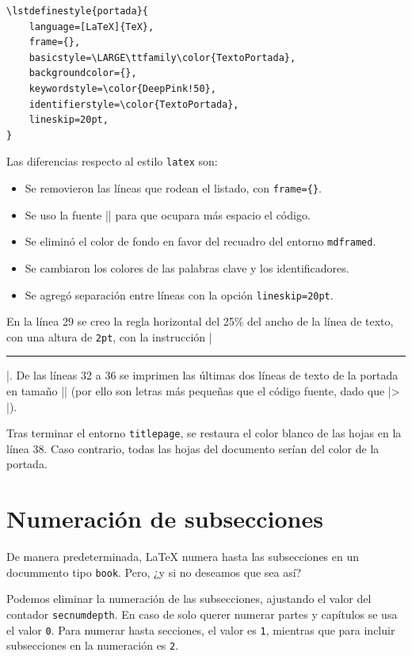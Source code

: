 \begin{lstlisting}[style=latex]
\lstdefinestyle{portada}{
    language=[LaTeX]{TeX},
    frame={},
    basicstyle=\LARGE\ttfamily\color{TextoPortada},
    backgroundcolor={},
    keywordstyle=\color{DeepPink!50},
    identifierstyle=\color{TextoPortada},
    lineskip=20pt,
}
\end{lstlisting}

\noindent Las diferencias respecto al estilo \texttt{latex} son:
\begin{itemize}
	\item Se removieron las líneas que rodean el listado, con \texttt{frame=\{\}}.
	\item Se uso la fuente |\LARGE| para que ocupara más espacio el código.
	\item Se eliminó el color de fondo en favor del recuadro del entorno \texttt{mdframed}.
	\item Se cambiaron los colores de las palabras clave y los identificadores.
	\item Se agregó separación entre líneas con la opción \texttt{lineskip=20pt}.
\end{itemize}

En la línea 29 se creo la regla horizontal del 25\% del ancho de la línea de texto, con una altura de \texttt{2pt}, con la instrucción |\rule{ancho}{alto}|. De las líneas 32 a 36 se imprimen las últimas dos líneas de texto de la portada en tamaño |\Large| (por ello son letras más pequeñas que el código fuente, dado que |\LARGE > \Large|).

Tras terminar el entorno \texttt{titlepage}, se restaura el color blanco de las hojas en la línea 38. Caso contrario, todas las hojas del documento serían del color de la portada.



\section{Numeración de subsecciones}
\label{sec:numeracion_de_subsecciones}



De manera predeterminada, \LaTeX{} numera hasta las subsecciones en un docummento tipo \texttt{book}. Pero, ¿y si no deseamos que sea así?

Podemos eliminar la numeración de las subsecciones, ajustando el valor del contador \texttt{secnumdepth}. En caso de solo querer numerar partes y capítulos se usa el valor \texttt{0}. Para numerar hasta secciones, el valor es \texttt{1}, mientras que para incluir subsecciones en la numeración es \texttt{2}.

